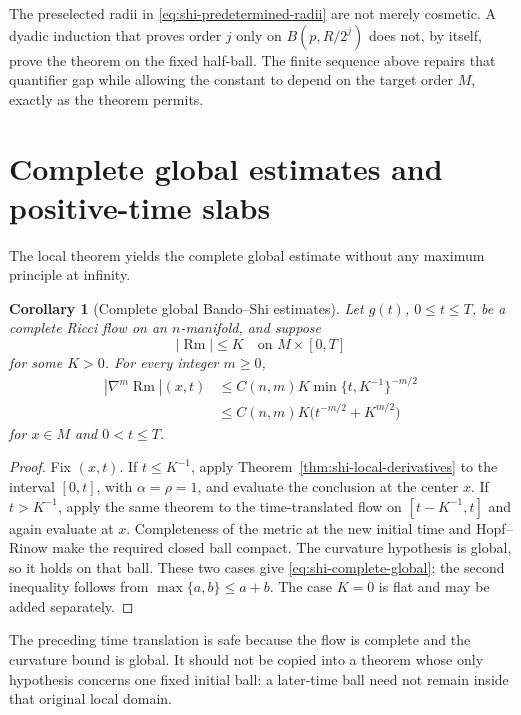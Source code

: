 \documentclass[10pt]{coll-l}
\newtheorem{corollary}[theorem]{Corollary}
\theoremstyle{definition}
\theoremstyle{remark}
\numberwithin{section}{chapter}
\numberwithin{equation}{chapter}
\newcommand{\Rm}{\operatorname{Rm}}
\begin{document}
The preselected radii in \eqref{eq:shi-predetermined-radii} are not merely
cosmetic.  A dyadic induction that proves order $j$ only on
$B(p,R/2^j)$ does not, by itself, prove the theorem on the fixed half-ball.
The finite sequence above repairs that quantifier gap while allowing the
constant to depend on the target order $M$, exactly as the theorem permits.

\section{Complete global estimates and positive-time slabs}
\label{sec:shi-global}

The local theorem yields the complete global estimate without any maximum
principle at infinity.

\begin{corollary}[Complete global Bando--Shi estimates]
\label{cor:shi-complete-global}
Let $g(t)$, $0\leq t\leq T$, be a complete Ricci flow on an $n$-manifold,
and suppose
\[
                 |\Rm|\leq K
       \quad\text{on }M\times[0,T]
\]
for some $K>0$.  For every integer $m\geq0$,
\begin{align}
 |\nabla^m\Rm|(x,t)
   &\leq C(n,m)K\min\{t,K^{-1}\}^{-m/2}                 \label{eq:shi-complete-global}\\
   &\leq C(n,m)K\bigl(t^{-m/2}+K^{m/2}\bigr)            \label{eq:shi-complete-global-sum}
\end{align}
for $x\in M$ and $0<t\leq T$.
\end{corollary}

\begin{proof}
Fix $(x,t)$.  If $t\leq K^{-1}$, apply
Theorem~\ref{thm:shi-local-derivatives} to the interval $[0,t]$, with
$\alpha=\rho=1$, and evaluate the conclusion at the center $x$.  If
$t>K^{-1}$, apply the same theorem to the time-translated flow on
$[t-K^{-1},t]$ and again evaluate at $x$.  Completeness of the metric at the
new initial time and Hopf--Rinow make the required closed ball compact.
The curvature hypothesis is global, so it holds on that ball.  These two
cases give \eqref{eq:shi-complete-global}; the second inequality follows
from $\max\{a,b\}\leq a+b$.  The case $K=0$ is flat and may be added
separately.
\end{proof}

The preceding time translation is safe because the flow is complete and the
curvature bound is global.  It should not be copied into a theorem whose
only hypothesis concerns one fixed initial ball: a later-time ball need not
remain inside that original local domain.
\end{document}
